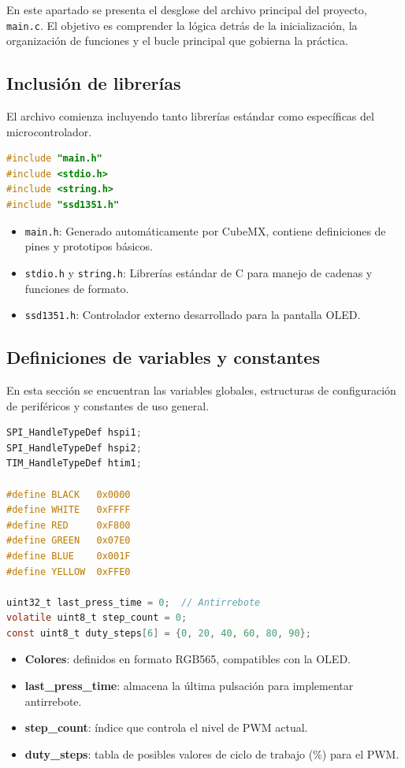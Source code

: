 \documentclass[a4paper,12pt]{article}
\begin{document}
En este apartado se presenta el desglose del archivo principal del proyecto, \texttt{main.c}.  
El objetivo es comprender la lógica detrás de la inicialización, la organización de funciones y el bucle principal que gobierna la práctica.

\subsection{Inclusión de librerías}
El archivo comienza incluyendo tanto librerías estándar como específicas del microcontrolador.  

\begin{lstlisting}[language=C]
#include "main.h"
#include <stdio.h>
#include <string.h>
#include "ssd1351.h"
\end{lstlisting}

\begin{itemize}
    \item \texttt{main.h}: Generado automáticamente por CubeMX, contiene definiciones de pines y prototipos básicos.
    \item \texttt{stdio.h} y \texttt{string.h}: Librerías estándar de C para manejo de cadenas y funciones de formato.
    \item \texttt{ssd1351.h}: Controlador externo desarrollado para la pantalla OLED.
\end{itemize}

\subsection{Definiciones de variables y constantes}
En esta sección se encuentran las variables globales, estructuras de configuración de periféricos y constantes de uso general.  

\begin{lstlisting}[language=C]
SPI_HandleTypeDef hspi1;
SPI_HandleTypeDef hspi2;
TIM_HandleTypeDef htim1;

#define BLACK   0x0000
#define WHITE   0xFFFF
#define RED     0xF800
#define GREEN   0x07E0
#define BLUE    0x001F
#define YELLOW  0xFFE0

uint32_t last_press_time = 0;  // Antirrebote
volatile uint8_t step_count = 0;
const uint8_t duty_steps[6] = {0, 20, 40, 60, 80, 90};
\end{lstlisting}

\begin{itemize}
    \item \textbf{Colores}: definidos en formato RGB565, compatibles con la OLED.
    \item \textbf{last\_press\_time}: almacena la última pulsación para implementar antirrebote.
    \item \textbf{step\_count}: índice que controla el nivel de PWM actual.
    \item \textbf{duty\_steps}: tabla de posibles valores de ciclo de trabajo (\%) para el PWM.
\end{itemize}
\end{document}
